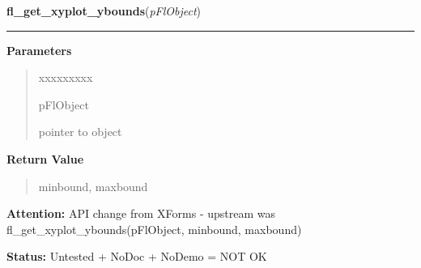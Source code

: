 \hspace{.8\funcindent}\begin{boxedminipage}{\funcwidth}

    \raggedright \textbf{fl\_get\_xyplot\_ybounds}(\textit{pFlObject})

    \vspace{-1.5ex}

    \rule{\textwidth}{0.5\fboxrule}
\setlength{\parskip}{2ex}
\setlength{\parskip}{1ex}
      \textbf{Parameters}
      \vspace{-1ex}

      \begin{quote}
        \begin{Ventry}{xxxxxxxxx}

          \item[pFlObject]

          pointer to object

        \end{Ventry}

      \end{quote}

      \textbf{Return Value}
    \vspace{-1ex}

      \begin{quote}
      minbound, maxbound

      \end{quote}

\textbf{Attention:} API change from XForms - upstream was fl\_get\_xyplot\_ybounds(pFlObject, 
minbound, maxbound)



\textbf{Status:} Untested + NoDoc + NoDemo = NOT OK



    \end{boxedminipage}

    \label{xformslib:flxyplot:fl_get_xyplot}

    \vspace{0.5ex}

